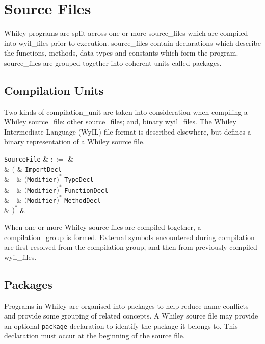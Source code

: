 \chapter{Source Files}
\label{c_source_files}
Whiley programs are split across one or more \gls{source_file}s which are compiled into \gls{wyil_file}s prior to execution. \Gls{source_file}s contain declarations which describe the functions, methods, data types and constants which form the program. \Gls{source_file}s are grouped together into coherent units called \gls{package}s.


\section{Compilation Units}
\label{c_source_files_compilation_units}
Two kinds of \gls{compilation_unit} are taken into consideration when compiling a Whiley \gls{source_file}: other \gls{source_file}s; and, binary \gls{wyil_file}s.  The Whiley Intermediate Language (WyIL) file format is described elsewhere, but defines a binary representation of a Whiley source file.  

\begin{syntax}
\verb+SourceFile+ & $::=$ &  \\
&  $\big($ & \verb+ImportDecl+\\
& $|$ & $($\verb+Modifier+$)^*$ \verb+TypeDecl+\\
& $|$ & $($\verb+Modifier+$)^*$ \verb+FunctionDecl+\\
& $|$ & $($\verb+Modifier+$)^*$ \verb+MethodDecl+ \\
& $\big)^*$ &\\
\end{syntax}

When one or more Whiley source files are compiled together, a \gls{compilation_group} is formed.  External symbols encountered during compilation are first resolved from the compilation group, and then from previously compiled \gls{wyil_file}s.

\section{Packages}
\label{c_source_files_packages}

Programs in Whiley are organised into \gls{package}s to help reduce name conflicts and provide some grouping of related concepts.  A Whiley source file may provide an optional \lstinline{package} declaration to identify the package it belongs to.  This declaration must occur at the beginning of the source file.

